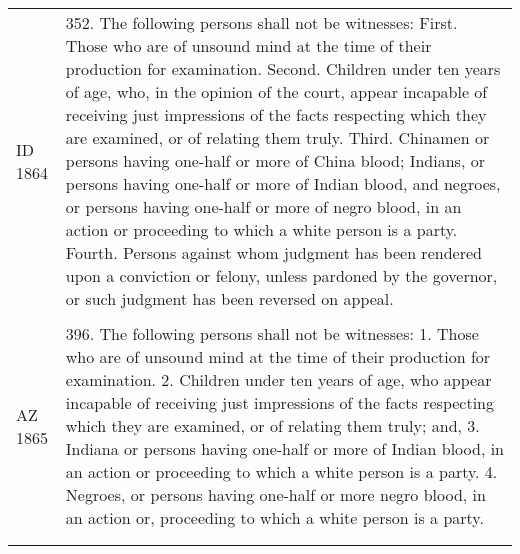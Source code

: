 \documentclass[12pt,]{article}
\begin{document}
\begin{longtable}[]{@{}ll@{}}
\begin{minipage}[t]{0.17\columnwidth}
ID 1864\strut
\end{minipage} & \begin{minipage}[t]{0.77\columnwidth}\raggedright
352. The following persons shall not be witnesses: First. Those who are
of unsound mind at the time of their production for examination. Second.
Children under ten years of age, who, in the opinion of the court,
appear incapable of receiving just impressions of the facts respecting
which they are examined, or of relating them truly. Third. Chinamen or
persons having one-half or more of China blood; Indians, or persons
having one-half or more of Indian blood, and negroes, or persons having
one-half or more of negro blood, in an action or proceeding to which a
white person is a party. Fourth. Persons against whom judgment has been
rendered upon a conviction or felony, unless pardoned by the governor,
or such judgment has been reversed on appeal.\strut
\end{minipage}\tabularnewline
\begin{minipage}[t]{0.17\columnwidth}\raggedright
\strut
\end{minipage} & \begin{minipage}[t]{0.77\columnwidth}\raggedright
\strut
\end{minipage}\tabularnewline
\begin{minipage}[t]{0.17\columnwidth}\raggedright
AZ 1865\strut
\end{minipage} & \begin{minipage}[t]{0.77\columnwidth}\raggedright
396. The following persons shall not be witnesses: 1. Those who are of
unsound mind at the time of their production for examination. 2.
Children under ten years of age, who appear incapable of receiving just
impressions of the facts respecting which they are examined, or of
relating them truly; and, 3. Indiana or persons having one-half or more
of Indian blood, in an action or proceeding to which a white person is a
party. 4. Negroes, or persons having one-half or more negro blood, in an
action or, proceeding to which a white person is a party.\strut
\end{minipage}\tabularnewline
\begin{minipage}[t]{0.17\columnwidth}\raggedright
\strut
\end{minipage} & \begin{minipage}[t]{0.77\columnwidth}\raggedright
\strut
\end{minipage}\tabularnewline
\begin{minipage}[t]{0.17\columnwidth}\raggedright

\end{minipage}
\end{longtable}
\end{document}
